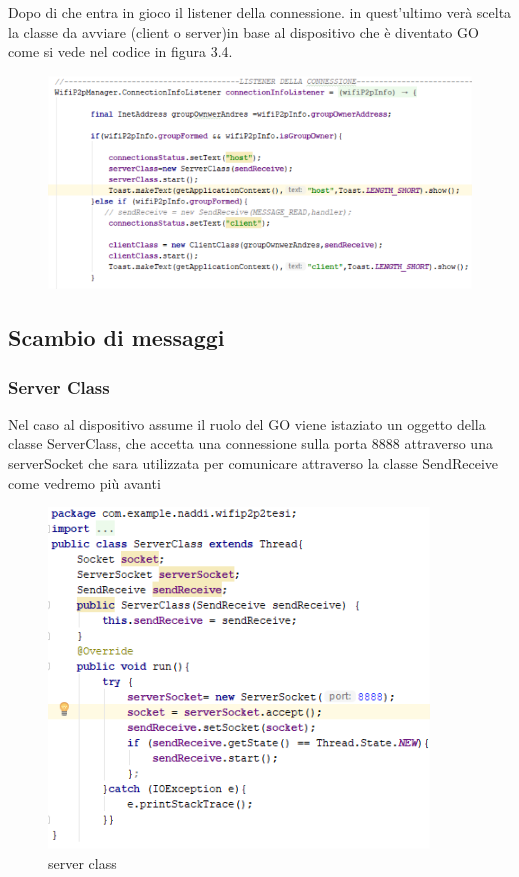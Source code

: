Dopo di che entra in gioco il listener della connessione.
in quest'ultimo verà scelta la classe da avviare 
(client o server)in base al dispositivo che è 
diventato GO come si vede nel codice in figura 3.4.

\begin{figure}
    \caption{}
    \includegraphics[width=1.2\columnwidth]{imgs/listenerConeessione.png}
\end{figure}

\subsection{Scambio di messaggi}
\subsubsection{Server Class}
Nel caso al dispositivo assume il ruolo del GO
viene istaziato un oggetto della  classe ServerClass,
che accetta una connessione sulla porta 8888 
attraverso una serverSocket che sara utilizzata per comunicare 
attraverso la classe SendReceive come vedremo più avanti 

\begin{figure}
    \caption{server class}
    \includegraphics[width=0.6\columnwidth]{imgs/serverClass.png}
    \centering
\end{figure}


